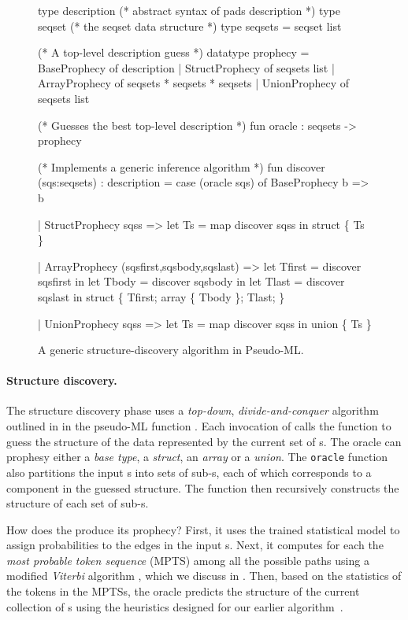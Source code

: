 \begin{figure}[t]
\begin{centercode}
type description  (* abstract syntax of pads description *)
type seqset       (* the seqset data structure *)
type seqsets = seqset list

(* A top-level description guess *)
datatype prophecy =
   BaseProphecy   of description
 | StructProphecy of seqsets list 
 | ArrayProphecy  of seqsets * seqsets * seqsets
 | UnionProphecy  of seqsets list

(* Guesses the best top-level description *)
fun oracle : seqsets -> prophecy

(* Implements a generic inference algorithm *)
fun discover (sqs:seqsets) : description =
 case (oracle sqs) of
   BaseProphecy b => b

 | StructProphecy sqss => 
     let Ts = map discover sqss in
     struct \{ Ts \}

 | ArrayProphecy (sqsfirst,sqsbody,sqslast) => 
     let Tfirst = discover sqsfirst in
     let Tbody  = discover sqsbody  in
     let Tlast  = discover sqslast  in
     struct \{ Tfirst; array \{ Tbody \}; Tlast; \}

 | UnionProphecy sqss => 
     let Ts = map discover sqss in
     union \{ Ts \}
\end{centercode}
\caption{A generic structure-discovery algorithm in Pseudo-ML.} 
\label{fig:structure-discovery}
\end{figure}

\paragraph*{Structure discovery.}
The structure discovery phase uses a {\em top-down}, {\em
divide-and-conquer} algorithm outlined in 
 in the pseudo-ML function
.  Each invocation of 
calls the  function to guess the structure of the data represented
by the current set of \seqset{}s.  The oracle can prophesy
either a {\em base type}, a {\em struct}, an {\em array} or a {\em union}.
The {\tt oracle} function also partitions the input \seqset{}s into
sets of sub-\seqset{}s, each of which corresponds to a component in
the guessed structure.  The  function then recursively 
constructs the structure of each set of sub-\seqset{}s.

How does the  produce its prophecy?
First, it uses the trained statistical model to assign probabilities
to the edges in the input \seqset{}s.
Next, it computes for each \seqset{} the {\em most probable token
sequence} (MPTS) among all the possible paths 
using a modified {\em Viterbi} algorithm \cite{rabiner89:hmm},
which we discuss in .
Then, based on the statistics of the tokens in the MPTSs,
the oracle predicts the structure of the current collection of
\seqset{}s using the heuristics designed for our earlier
algorithm~\cite{fisher+:dirttoshovels}. 

